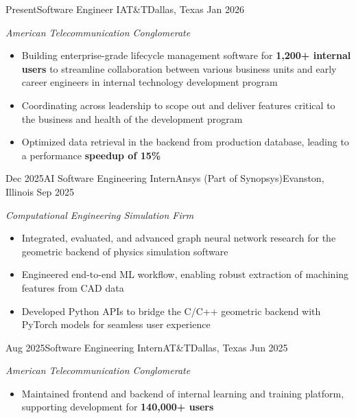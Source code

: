 %
%
%


\begin{experiences}
	\experience
		{Present}{Software Engineer I}{AT\&T}{Dallas, Texas}
		{Jan 2026}
		{\footnotesize\emph{American Telecommunication Conglomerate}
		\begin{itemize}
			\item Building enterprise-grade lifecycle management software for \textbf{1,200+ internal users} to streamline collaboration between various business units and early career engineers in internal technology development program
			\item Coordinating across leadership to scope out and deliver features critical to the business and health of the development program
			\item Optimized data retrieval in the backend from production database, leading to a performance \textbf{speedup of 15\%}
		\end{itemize}\vspace{-1em}}
		{}
	\emptySeparator
	\experience
		{Dec 2025}{AI Software Engineering Intern}{Ansys (Part of Synopsys)}{Evanston, Illinois}
		{Sep 2025}
		{\footnotesize\emph{Computational Engineering Simulation Firm}
		\begin{itemize}
			\item Integrated, evaluated, and advanced graph neural network research for the geometric backend of physics simulation software
			\item Engineered end-to-end ML workflow, enabling robust extraction of machining features from CAD data
			\item Developed Python APIs to bridge the C/C++ geometric backend with PyTorch models for seamless user experience
		\end{itemize}\vspace{-1em}}
		{}
	\emptySeparator
	\experience
		{Aug 2025}{Software Engineering Intern}{AT\&T}{Dallas, Texas}
		{Jun 2025}
		{\footnotesize\emph{American Telecommunication Conglomerate}
		\begin{itemize}
			\item Maintained frontend and backend of internal learning and training platform, supporting development for \textbf{140,000+ users}

\end{itemize}}
\end{experiences}
